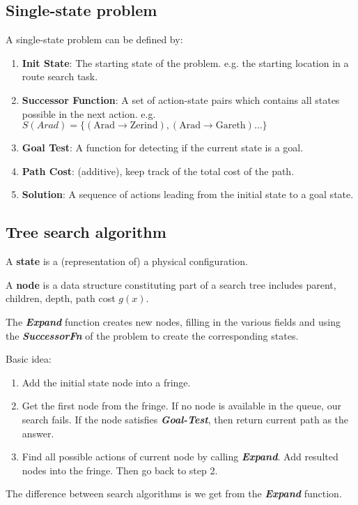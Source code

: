 \documentclass{ainote}
\begin{document}
\subsection{Single-state problem}
A single-state problem can be defined by:
\begin{enumerate}
    \item \textbf{Init State}: The starting state of the problem. e.g. the starting location in a route search task.
    \item \textbf{Successor Function}: A set of action-state pairs which contains all states possible in the next action. e.g. $S(Arad)=\{(\text{Arad} \rightarrow \text{Zerind}),(\text{Arad} \rightarrow \text{Gareth})\dots\}$
    \item \textbf{Goal Test}: A function for detecting if the current state is a goal. 
    \item \textbf{Path Cost}: (additive), keep track of the total cost of the path.
    \item \textbf{Solution}: A sequence of actions leading from the initial state to a goal state.
\end{enumerate}


\subsection{Tree search algorithm}
A \textbf{state} is a (representation of) a physical configuration.

A \textbf{node} is a data structure constituting part of a search tree
includes parent, children, depth, path cost $g(x)$.


The \textbf{\textit{Expand}} function creates new nodes, filling in the various fields and
using the \textbf{\textit{SuccessorFn}} of the problem to create the corresponding states.
\begin{info}
    Basic idea:
    \begin{enumerate}
        \item Add the initial state node into a fringe.
        \item Get the first node from the fringe. If no node is available in the queue, our search fails. If the node satisfies \textbf{\textit{Goal-Test}}, then return current path as the answer.
        \item Find all possible actions of current node by calling \textbf{\textit{Expand}}. Add resulted nodes into the fringe. Then go back to step 2.
    \end{enumerate}

    The difference between search algorithms is  we get from the \textbf{\textit{Expand}} function. 
\end{info}
\end{document}
